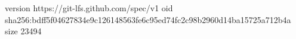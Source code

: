 version https://git-lfs.github.com/spec/v1
oid sha256:bdff5f04627834e9c126148563fe6c95ed74fc2c98b2960d14ba15725a712b4a
size 23494
